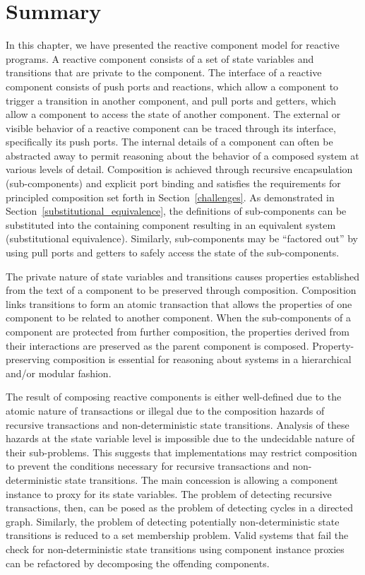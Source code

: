 \section{Summary}
In this chapter, we have presented the reactive component model for reactive programs.
A reactive component consists of a set of state variables and transitions that are private to the component.
The interface of a reactive component consists of push ports and reactions, which allow a component to trigger a transition in another component, and pull ports and getters, which allow a component to access the state of another component.
The external or visible behavior of a reactive component can be traced through its interface, specifically its push ports.
The internal details of a component can often be abstracted away to permit reasoning about the behavior of a composed system at various levels of detail.
Composition is achieved through recursive encapsulation (sub-components) and explicit port binding and satisfies the requirements for principled composition set forth in Section~\ref{challenges}.
As demonstrated in Section~\ref{substitutional_equivalence}, the definitions of sub-components can be substituted into the containing component resulting in an equivalent system (substitutional equivalence).
Similarly, sub-components may be ``factored out'' by using pull ports and getters to safely access the state of the sub-components.

The private nature of state variables and transitions causes properties established from the text of a component to be preserved through composition.
Composition links transitions to form an atomic transaction that allows the properties of one component to be related to another component.
When the sub-components of a component are protected from further composition, the properties derived from their interactions are preserved as the parent component is composed.
Property-preserving composition is essential for reasoning about systems in a hierarchical and/or modular fashion.

The result of composing reactive components is either well-defined due to the atomic nature of transactions or illegal due to the composition hazards of recursive transactions and non-deterministic state transitions.
Analysis of these hazards at the state variable level is impossible due to the undecidable nature of their sub-problems.
This suggests that implementations may restrict composition to prevent the conditions necessary for recursive transactions and non-deterministic state transitions.
The main concession is allowing a component instance to proxy for its state variables.
The problem of detecting recursive transactions, then, can be posed as the problem of detecting cycles in a directed graph.
Similarly, the problem of detecting potentially non-deterministic state transitions is reduced to a set membership problem.
Valid systems that fail the check for non-deterministic state transitions using component instance proxies can be refactored by decomposing  the offending components.
